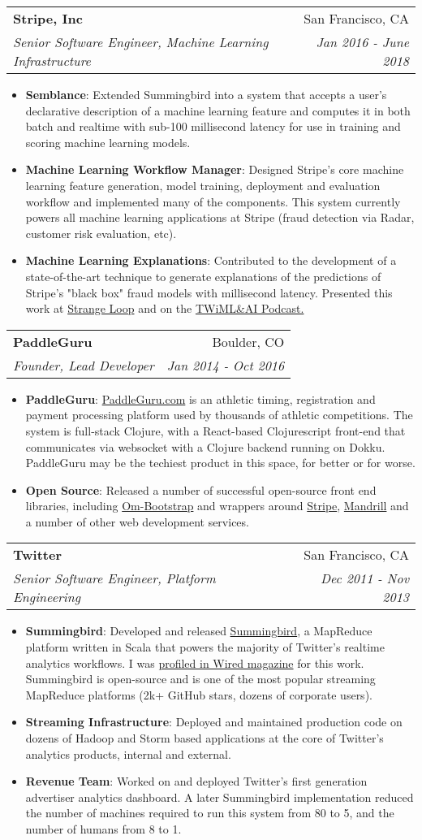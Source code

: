 \documentclass[letterpaper,11pt]{article}
\makeatletter
\newcommand{\resumeItem}[2]{\item\small{
    \textbf{#1}{: #2 \vspace{-2pt}}
  }
}
\newcommand{\resumeSubheading}[4]{
  \vspace{-1pt}\item[]\begin{tabular*}{0.97\textwidth}[t]{l@{\extracolsep{\fill}}r}
    \textbf{#1} & #2 \\
    \textit{\small#3} & \textit{\small #4} \\
  \end{tabular*}\vspace{-5pt}
}
\newcommand{\resumeItemListStart}{\begin{itemize}}
\newcommand{\resumeItemListEnd}{\end{itemize}\vspace{-5pt}}
\makeatother
\begin{document}
\resumeSubheading{Stripe, Inc}{San Francisco, CA}{
  Senior Software Engineer, Machine Learning Infrastructure}{Jan 2016 - June 2018}
\resumeItemListStart
\resumeItem{Semblance}{
  Extended Summingbird into a system that accepts a user's declarative description of a machine learning feature and computes it in both batch and realtime with sub-100 millisecond latency for use in training and scoring machine learning models.}
\resumeItem{Machine Learning Workflow Manager}{
  Designed Stripe's core machine learning feature generation, model training, deployment and evaluation workflow and implemented many of the components. This system currently powers all machine learning applications at Stripe (fraud detection via Radar, customer risk evaluation, etc).}
\resumeItem{Machine Learning Explanations}{
  Contributed to the development of a state-of-the-art technique to generate explanations of the predictions of Stripe's "black box" fraud models with millisecond latency. Presented this work at \href{https://www.youtube.com/watch?v=DiWkKqZChF0}{Strange Loop} and on the \href{https://twimlai.com/twiml-talk-73-exploring-black-box-predictions-sam-ritchie/}{TWiML\&AI Podcast.}}
\resumeItemListEnd

\resumeSubheading{PaddleGuru}{Boulder, CO}{
  Founder, Lead Developer}{Jan 2014 - Oct 2016}
\resumeItemListStart
\resumeItem{PaddleGuru}{
  \href{https://paddleguru.com}{PaddleGuru.com} is an athletic timing, registration and payment processing platform used by thousands of athletic competitions. The system is full-stack Clojure, with a React-based Clojurescript front-end that communicates via websocket with a Clojure backend running on Dokku. PaddleGuru may be the techiest product in this space, for better or for worse.}
\resumeItem{Open Source}{
  Released a number of successful open-source front end libraries, including \href{https://github.com/racehub/om-bootstrap}{Om-Bootstrap} and wrappers around \href{https://github.com/racehub/stripe-clj}{Stripe}, \href{https://github.com/racehub/mandrill-clj}{Mandrill} and a number of other web development services.}
\resumeItemListEnd

\resumeSubheading{Twitter}{San Francisco, CA}{
  Senior Software Engineer, Platform Engineering}{Dec 2011 - Nov 2013}
\resumeItemListStart
\resumeItem{Summingbird}{
  Developed and released \href{https://github.com/twitter/summingbird}{Summingbird}, a MapReduce platform written in Scala that powers the majority of Twitter's realtime analytics workflows. I was \href{https://www.wired.com/2013/11/twitter-summingbird/}{profiled in Wired magazine} for this work. Summingbird is open-source and is one of the most popular streaming MapReduce platforms (2k+ GitHub stars, dozens of corporate users).}
\resumeItem{Streaming Infrastructure}{
  Deployed and maintained production code on dozens of Hadoop and Storm based applications at the core of Twitter's analytics products, internal and external.}
\resumeItem{Revenue Team}{
  Worked on and deployed Twitter's first generation advertiser analytics dashboard. A later Summingbird implementation reduced the number of machines required to run this system from 80 to 5, and the number of humans from 8 to 1.}
\resumeItemListEnd
\end{document}

